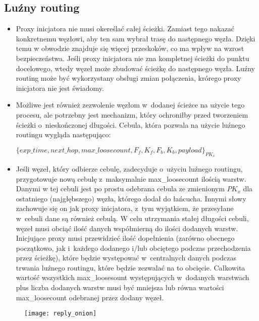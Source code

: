         \subsection{Luźny routing}
        \begin{itemize}
            \item Proxy inicjatora nie musi okereślać całej ścieżki. Zamiast tego nakazać konkretnemu węzłowi, aby ten sam wybrał trasę do następnego węzła. Dzięki temu w obwodzie znajduje się więcej przeskoków, co ma wpływ na wzrost bezpieczeństwa. Jeśli proxy inicjatora nie zna kompletnej ścieżki do punktu docelowego, wtedy węzeł może zbudować ścieżkę do następnego węzła. Luźny routing może być wykorzystany obsługi zmian połączenia, krórego proxy inicjatora nie jest świadomy.
            \item Możliwe jest również zezwolenie węzłom w~dodanej ścieżce na użycie tego procesu, ale potrzebny jest mechanizm, który ochroniłby przed tworzeniem ścieżki o~nieskończonej długości. Cebula, która pozwala na użycie luźnego routingu wygląda następująco:

            $\{exp\_time, next\_hop, max\_loosecount, F_f, K_f, F_b, K_b, payload\}_{PK_x}$

            \item Jeśli węzeł, który odbierze cebulę, zadecyduje o~użyciu luźnego routingu, przygotowuje nową cebulę z~maksymalnie max\_loosecount ilością warstw. Danymi w tej cebuli jest po prostu odebrana cebula ze zmienionym $PK_x$ dla ostatniego (najgłębszego) węzła, którego dodał do łańcucha. Innymi słowy zachowuje się on jak proxy inicjatora, z~tym wyjątkiem, że przesyłane w~cebuli dane są również cebulą. W celu utrzymania stałej długości cebuli, węzeł musi obciąć ilość danych współmierną do ilości dodanych warstw. Inicjujące proxy musi przewidzieć ilość dopełnienia (zarówno obecnego początkowo, jak i~każdego dodanego i/lub obciętego podczas przechodzenia przez ścieżkę), które będzie występować w~centralnych danych podczas trwania luźnego routingu, które będzie zezwalać na to obcięcie. Całkowita wartość wszystkich max\_loosesount występujących w~dodanych warstwach plus liczba dodanych warstw musi być mniejsza lub równa wartości max\_loosecount odebranej przez dodany węzeł.
        \end{itemize}

        \begin{figure}
            \texttt{[image: reply\_onion]}
        \end{figure}
